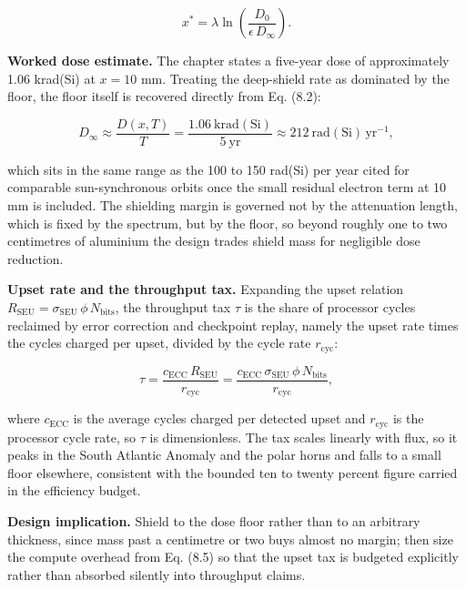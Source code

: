 \documentclass[
  11pt,
  openany,
  oneside]{book}
\begin{document}
\begin{equation}
x^{*} = \lambda \ln\!\left( \frac{D_0}{\epsilon\, D_\infty} \right). \tag{8.3}
\end{equation}

\textbf{Worked dose estimate.} The chapter states a five-year dose of
approximately 1.06 krad(Si) at \(x = 10\) mm. Treating the deep-shield
rate as dominated by the floor, the floor itself is recovered directly
from Eq. (8.2):

\begin{equation}
D_\infty \approx \frac{D(x,T)}{T} = \frac{1.06\ \mathrm{krad(Si)}}{5\ \mathrm{yr}} \approx 212\ \mathrm{rad(Si)\,yr^{-1}}, \tag{8.4}
\end{equation}

which sits in the same range as the 100 to 150 rad(Si) per year cited
for comparable sun-synchronous orbits once the small residual electron
term at 10 mm is included. The shielding margin is governed not by the
attenuation length, which is fixed by the spectrum, but by the floor, so
beyond roughly one to two centimetres of aluminium the design trades
shield mass for negligible dose reduction.

\textbf{Upset rate and the throughput tax.} Expanding the upset relation
\(R_{\mathrm{SEU}} = \sigma_{\mathrm{SEU}}\,\phi\, N_{\mathrm{bits}}\),
the throughput tax \(\tau\) is the share of processor cycles reclaimed
by error correction and checkpoint replay, namely the upset rate times
the cycles charged per upset, divided by the cycle rate
\(r_{\mathrm{cyc}}\):

\begin{equation}
\tau = \frac{c_{\mathrm{ECC}}\, R_{\mathrm{SEU}}}{r_{\mathrm{cyc}}} = \frac{c_{\mathrm{ECC}}\, \sigma_{\mathrm{SEU}}\, \phi\, N_{\mathrm{bits}}}{r_{\mathrm{cyc}}}, \tag{8.5}
\end{equation}

where \(c_{\mathrm{ECC}}\) is the average cycles charged per detected
upset and \(r_{\mathrm{cyc}}\) is the processor cycle rate, so \(\tau\)
is dimensionless. The tax scales linearly with flux, so it peaks in the
South Atlantic Anomaly and the polar horns and falls to a small floor
elsewhere, consistent with the bounded ten to twenty percent figure
carried in the efficiency budget.

\textbf{Design implication.} Shield to the dose floor rather than to an
arbitrary thickness, since mass past a centimetre or two buys almost no
margin; then size the compute overhead from Eq. (8.5) so that the upset
tax is budgeted explicitly rather than absorbed silently into throughput
claims.
\end{document}
